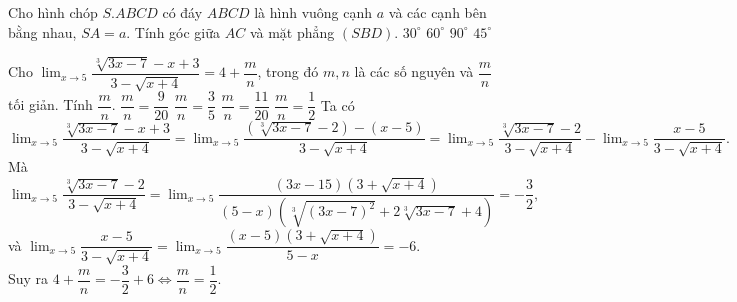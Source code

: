 \begin{ex}%
	Cho hình chóp $S.ABCD$ có đáy $ABCD$ là hình vuông cạnh $a$ và các cạnh bên bằng nhau, $SA=a$. Tính góc giữa $AC$ và mặt phẳng $(SBD)$.
	\choice
	{$30^\circ$}
	{$60^\circ$}
	{\True $90^\circ$}
	{$45^\circ$}
\end{ex}

\begin{ex}%
	Cho $\displaystyle\lim_{x \to 5}\dfrac{\sqrt[3]{3x-7}-x+3}{3-\sqrt{x+4}}=4+\dfrac{m}{n}$, trong đó $m,n$ là các số nguyên và $\dfrac{m}{n}$ tối giản. Tính $\dfrac{m}{n}$.
	\choice
	{$\dfrac{m}{n}=\dfrac{9}{20}$}
	{$\dfrac{m}{n}=\dfrac{3}{5}$}
	{$\dfrac{m}{n}=\dfrac{11}{20}$}
	{\True $\dfrac{m}{n}=\dfrac{1}{2}$}
	\loigiai
	{Ta có 
		$\displaystyle\lim_{x \to 5}\dfrac{\sqrt[3]{3x-7}-x+3}{3-\sqrt{x+4}}=\displaystyle\lim_{x \to 5}\dfrac{\left(\sqrt[3]{3x-7}-2\right)-(x-5)}{3-\sqrt{x+4}}=\displaystyle\lim_{x \to 5}\dfrac{\sqrt[3]{3x-7}-2}{3-\sqrt{x+4}}-\displaystyle\lim_{x \to 5}\dfrac{x-5}{3-\sqrt{x+4}}.$\\
		Mà $\displaystyle\lim_{x \to 5}\dfrac{\sqrt[3]{3x-7}-2}{3-\sqrt{x+4}}=\displaystyle\lim_{x \to 5}\dfrac{(3x-15)\left(3+\sqrt{x+4}\right)}{(5-x)\left(\sqrt[3]{(3x-7)^2}+2\sqrt[3]{3x-7}+4\right)}=-\dfrac{3}{2},$\\ và $\displaystyle\lim_{x \to 5}\dfrac{x-5}{3-\sqrt{x+4}}=\displaystyle\lim_{x \to 5}\dfrac{(x-5)\left(3+\sqrt{x+4}\right)}{5-x}=-6.$\\
		Suy ra $4+\dfrac{m}{n}=-\dfrac{3}{2}+6 \Leftrightarrow \dfrac{m}{n}=\dfrac{1}{2}.$
	}
\end{ex}

